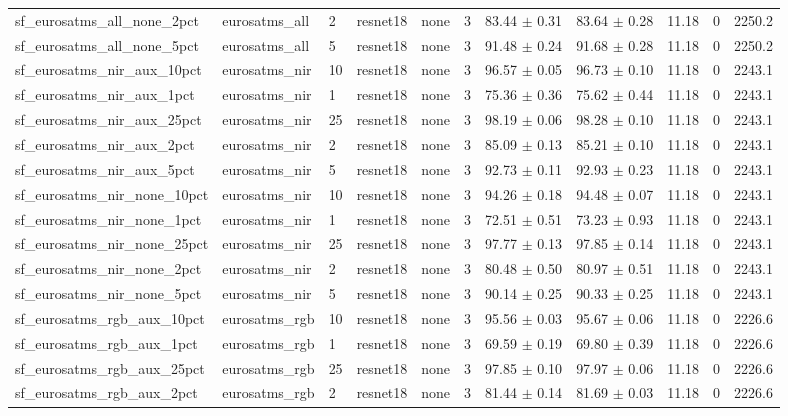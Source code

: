 \begin{tabular}{lllllllllll}
sf_eurosatms_all_none_2pct & eurosatms_all & 2 & resnet18 & none & 3 & 83.44 $\pm$ 0.31 & 83.64 $\pm$ 0.28 & 11.18 & 0 & 2250.2 \\
sf_eurosatms_all_none_5pct & eurosatms_all & 5 & resnet18 & none & 3 & 91.48 $\pm$ 0.24 & 91.68 $\pm$ 0.28 & 11.18 & 0 & 2250.2 \\
sf_eurosatms_nir_aux_10pct & eurosatms_nir & 10 & resnet18 & none & 3 & 96.57 $\pm$ 0.05 & 96.73 $\pm$ 0.10 & 11.18 & 0 & 2243.1 \\
sf_eurosatms_nir_aux_1pct & eurosatms_nir & 1 & resnet18 & none & 3 & 75.36 $\pm$ 0.36 & 75.62 $\pm$ 0.44 & 11.18 & 0 & 2243.1 \\
sf_eurosatms_nir_aux_25pct & eurosatms_nir & 25 & resnet18 & none & 3 & 98.19 $\pm$ 0.06 & 98.28 $\pm$ 0.10 & 11.18 & 0 & 2243.1 \\
sf_eurosatms_nir_aux_2pct & eurosatms_nir & 2 & resnet18 & none & 3 & 85.09 $\pm$ 0.13 & 85.21 $\pm$ 0.10 & 11.18 & 0 & 2243.1 \\
sf_eurosatms_nir_aux_5pct & eurosatms_nir & 5 & resnet18 & none & 3 & 92.73 $\pm$ 0.11 & 92.93 $\pm$ 0.23 & 11.18 & 0 & 2243.1 \\
sf_eurosatms_nir_none_10pct & eurosatms_nir & 10 & resnet18 & none & 3 & 94.26 $\pm$ 0.18 & 94.48 $\pm$ 0.07 & 11.18 & 0 & 2243.1 \\
sf_eurosatms_nir_none_1pct & eurosatms_nir & 1 & resnet18 & none & 3 & 72.51 $\pm$ 0.51 & 73.23 $\pm$ 0.93 & 11.18 & 0 & 2243.1 \\
sf_eurosatms_nir_none_25pct & eurosatms_nir & 25 & resnet18 & none & 3 & 97.77 $\pm$ 0.13 & 97.85 $\pm$ 0.14 & 11.18 & 0 & 2243.1 \\
sf_eurosatms_nir_none_2pct & eurosatms_nir & 2 & resnet18 & none & 3 & 80.48 $\pm$ 0.50 & 80.97 $\pm$ 0.51 & 11.18 & 0 & 2243.1 \\
sf_eurosatms_nir_none_5pct & eurosatms_nir & 5 & resnet18 & none & 3 & 90.14 $\pm$ 0.25 & 90.33 $\pm$ 0.25 & 11.18 & 0 & 2243.1 \\
sf_eurosatms_rgb_aux_10pct & eurosatms_rgb & 10 & resnet18 & none & 3 & 95.56 $\pm$ 0.03 & 95.67 $\pm$ 0.06 & 11.18 & 0 & 2226.6 \\
sf_eurosatms_rgb_aux_1pct & eurosatms_rgb & 1 & resnet18 & none & 3 & 69.59 $\pm$ 0.19 & 69.80 $\pm$ 0.39 & 11.18 & 0 & 2226.6 \\
sf_eurosatms_rgb_aux_25pct & eurosatms_rgb & 25 & resnet18 & none & 3 & 97.85 $\pm$ 0.10 & 97.97 $\pm$ 0.06 & 11.18 & 0 & 2226.6 \\
sf_eurosatms_rgb_aux_2pct & eurosatms_rgb & 2 & resnet18 & none & 3 & 81.44 $\pm$ 0.14 & 81.69 $\pm$ 0.03 & 11.18 & 0 & 2226.6 \\

\end{tabular}
